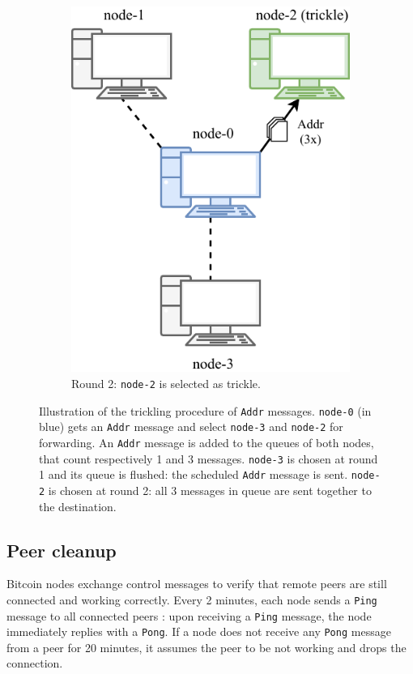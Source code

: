 \begin{figure}[ht!]
\begin{subfigure}{.42\textwidth}
		\includegraphics[width=\columnwidth]{figures/trickling_2}
		\vspace*{0.1cm}
		\caption{
			Round \num{2}:
			\texttt{node-2} is selected as trickle.
		}
		\vspace*{0.2cm}
	\end{subfigure}
	\caption[Illustration of the trickling procedure]{
		Illustration of the trickling procedure of \texttt{Addr} messages.
		\texttt{node-0} (in blue) gets an \texttt{Addr} message and select \texttt{node-3} and \texttt{node-2} for forwarding.
		An \texttt{Addr} message is added to the queues of both nodes, that count respectively \num{1} and \num{3} messages.
		\texttt{node-3} is chosen at round \num{1} and its queue is flushed:
		the scheduled \texttt{Addr} message is sent.
		\texttt{node-2} is chosen at round \num{2}:
		all \num{3} messages in queue are sent together to the destination.
	}
	\label{fig:trickling}
\end{figure}

\subsection{Peer cleanup}
\label{sub:peer-cleanup}
Bitcoin nodes exchange control messages to verify that remote peers are still connected and working correctly.
Every \num{2} minutes, each node sends a \texttt{Ping} message to all connected peers \cite{bitcoin_ping_pong}:
upon receiving a \texttt{Ping} message, the node immediately replies with a \texttt{Pong}.
If a node does not receive any \texttt{Pong} message from a peer for \num{20} minutes, it assumes the peer to be not working and drops the connection.

